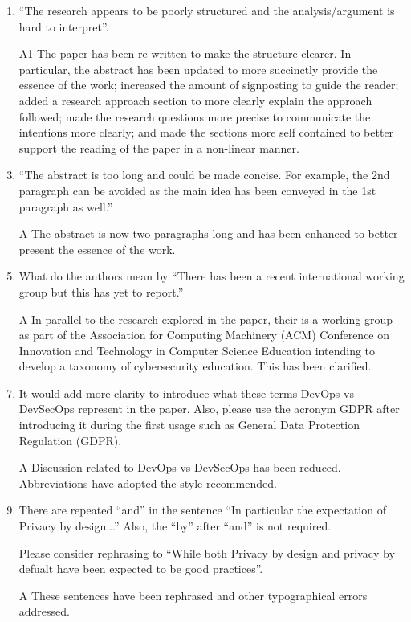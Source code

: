 \documentclass{article}
\begin{document}
\begin{enumerate}
\item ``The research appears to be poorly structured and the analysis/argument is hard to interpret''.
\item[A1]The paper has been re-written to  make the structure clearer. In particular, the abstract has been updated to more succinctly provide the essence of the work; increased the amount of signposting to guide the reader; added a research approach section to more clearly explain the approach followed; made the research questions more precise to communicate the intentions more clearly; and made the sections more self contained to better support the reading of the paper in a non-linear manner.
\item ``The abstract is too long and could be made concise. For example, the 2nd paragraph can be avoided as the main idea has been conveyed in the 1st paragraph as well.''
\item[A] The abstract is now two paragraphs long and has been enhanced to better present the essence of the work.
\item What do the authors mean by ``There has been a recent international working group but this has yet to report.'' 
\item[A] In parallel to the research explored in the paper, their is a working group as part of the Association for Computing Machinery (ACM) Conference on Innovation and Technology in Computer Science Education intending to develop a taxonomy of cybersecurity education. This has been clarified.
\item It would add more clarity to introduce what these terms DevOps vs DevSecOps represent in the paper. Also, please use the acronym GDPR after introducing it during the first usage such as General Data Protection Regulation (GDPR). 
\item[A] Discussion related to DevOps vs DevSecOps has been reduced. Abbreviations have adopted the style recommended. 
\item There are repeated ``and'' in the sentence ``In particular the expectation of Privacy by design...'' Also, the ``by'' after ``and'' is not required. 

Please consider rephrasing to ``While both Privacy by design and privacy by defualt have been expected to be good practices''.

\item[A] These sentences have been rephrased and other typographical errors addressed.


\end{enumerate}
\end{document}
